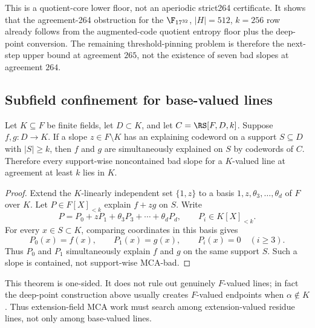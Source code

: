 \begin{remark}
This is a quotient-core lower floor, not an aperiodic strict264 certificate.  It
shows that the agreement-264 obstruction for the \(\F_{17^{32}}\), \(|H|=512\),
\(k=256\) row already follows from the augmented-code quotient entropy floor plus
the deep-point conversion.  The remaining threshold-pinning problem is therefore
the next-step upper bound at agreement \(265\), not the existence of seven bad
slopes at agreement \(264\).
\end{remark}

\subsection{Subfield confinement for base-valued lines}

\begin{theorem}
\label{thm:base-valued-subfield-confinement}
Let \(K\subseteq F\) be finite fields, let \(D\subset K\), and let
\(C=\RS[F,D,k]\).  Suppose \(f,g:D\to K\).  If a slope \(z\in F\setminus K\)
has an explaining codeword on a support \(S\subseteq D\) with \(|S|\geq k\),
then \(f\) and \(g\) are simultaneously explained on \(S\) by codewords of
\(C\).  Therefore every support-wise noncontained bad slope for a \(K\)-valued
line at agreement at least \(k\) lies in \(K\).
\end{theorem}

\begin{proof}
Extend the \(K\)-linearly independent set \(\{1,z\}\) to a basis
\(1,z,\theta_3,
\ldots,\theta_d\) of \(F\) over \(K\).  Let \(P\in F[X]_{<k}\) explain
\(f+zg\) on \(S\).  Write
\[
  P=P_0+zP_1+\theta_3P_3+\cdots+\theta_dP_d,
  \qquad P_i\in K[X]_{<k}.
\]
For every \(x\in S\subset K\), comparing coordinates in this basis gives
\[
  P_0(x)=f(x),
  \qquad
  P_1(x)=g(x),
  \qquad
  P_i(x)=0\quad(i\geq3).
\]
Thus \(P_0\) and \(P_1\) simultaneously explain \(f\) and \(g\) on the same
support \(S\).  Such a slope is contained, not support-wise MCA-bad.
\end{proof}

\begin{remark}
This theorem is one-sided.  It does not rule out genuinely \(F\)-valued lines;
in fact the deep-point construction above usually creates \(F\)-valued endpoints
when \(\alpha\notin K\).  Thus extension-field MCA work must search among
extension-valued residue lines, not only among base-valued lines.
\end{remark}
